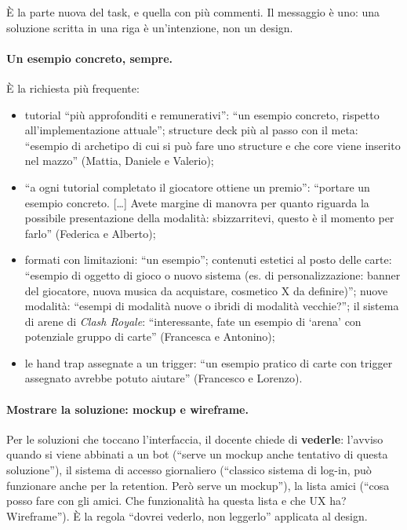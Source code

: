 È la parte nuova del task, e quella con più commenti. Il messaggio è uno: una
soluzione scritta in una riga è un'intenzione, non un design.

\paragraph{Un esempio concreto, sempre.} È la richiesta più frequente:
\begin{itemize}
  \item tutorial ``più approfonditi e remunerativi'': ``un esempio concreto,
        rispetto all'implementazione attuale''; structure deck più al passo
        con il meta: ``esempio di archetipo di cui si può fare uno structure e
        che core viene inserito nel mazzo'' (Mattia, Daniele e Valerio);
  \item ``a ogni tutorial completato il giocatore ottiene un premio'':
        ``portare un esempio concreto. [\dots] Avete margine di manovra per
        quanto riguarda la possibile presentazione della modalità:
        sbizzarritevi, questo è il momento per farlo'' (Federica e Alberto);
  \item formati con limitazioni: ``un esempio''; contenuti estetici al posto
        delle carte: ``esempio di oggetto di gioco o nuovo sistema (es. di
        personalizzazione: banner del giocatore, nuova musica da acquistare,
        cosmetico X da definire)''; nuove modalità: ``esempi di modalità nuove
        o ibridi di modalità vecchie?''; il sistema di arene di \emph{Clash
        Royale}: ``interessante, fate un esempio di `arena' con potenziale
        gruppo di carte'' (Francesca e Antonino);
  \item le hand trap assegnate a un trigger: ``un esempio pratico di carte
        con trigger assegnato avrebbe potuto aiutare'' (Francesco e Lorenzo).
\end{itemize}

\paragraph{Mostrare la soluzione: mockup e wireframe.} Per le soluzioni che
toccano l'interfaccia, il docente chiede di \textbf{vederle}: l'avviso quando
si viene abbinati a un bot (``serve un mockup anche tentativo di questa
soluzione''), il sistema di accesso giornaliero (``classico sistema di
log-in, può funzionare anche per la retention. Però serve un mockup''), la
lista amici (``cosa posso fare con gli amici. Che funzionalità ha questa
lista e che UX ha? Wireframe''). È la regola ``dovrei vederlo, non leggerlo''
applicata al design.

